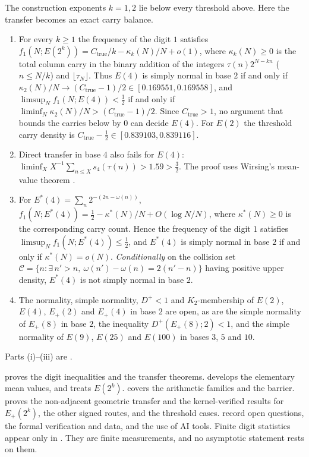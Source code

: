 \documentclass[11pt]{article}
\newcommand{\Ctrue}{C_{\mathrm{true}}}
\begin{document}
The construction exponents $k=1,2$ lie below every threshold above. Here the transfer becomes an exact carry balance.

\begin{maintheorem}\label{thm:thresholds}
\begin{enumerate}[label=\textup{(\roman*)},nosep]
\item {} For every $k\ge1$ the frequency of the digit $1$ satisfies $f_1(N;E(2^k))=\Ctrue/k-\kappa_k(N)/N+o(1)$, where $\kappa_k(N)\ge0$ is the total column carry in the binary addition of the integers $\tau(n)2^{N-kn}$ ($n\le N/k$) and $\lfloor\tau_N\rfloor$. Thus $E(4)$ is simply normal in base $2$ if and only if $\kappa_2(N)/N\to(\Ctrue-1)/2\in[0.169551,0.169558]$, and $\limsup_Nf_1(N;E(4))<\frac12$ if and only if $\liminf_N\kappa_2(N)/N>(\Ctrue-1)/2$. Since $\Ctrue>1$, no argument that bounds the carries below by $0$ can decide $E(4)$. For $E(2)$ the threshold carry density is $\Ctrue-\frac12\in[0.839103,0.839116]$.
\item {} Direct transfer in base $4$ also fails for $E(4)$: $\liminf_XX^{-1}\sum_{n\le X}s_4(\tau(n))>1.59>\frac32$. The proof uses Wirsing's mean-value theorem \cite{Wirsing1967}.
\item {} For $E^*(4)=\sum_n2^{-(2n-\omega(n))}$, $f_1(N;E^*(4))=\frac12-\kappa^*(N)/N+O(\log N/N)$, where $\kappa^*(N)\ge0$ is the corresponding carry count. Hence the frequency of the digit $1$ satisfies $\limsup_Nf_1(N;E^*(4))\le\frac12$, and $E^*(4)$ is simply normal in base $2$ if and only if $\kappa^*(N)=o(N)$. \emph{Conditionally} on the collision set $\mathcal C=\{n:\exists\,n'>n,\ \omega(n')-\omega(n)=2(n'-n)\}$ having positive upper density, $E^*(4)$ is not simply normal in base $2$.
\item {} The normality, simple normality, $D^+<1$ and $K_2$-membership of $E(2)$, $E(4)$, $E_+(2)$ and $E_+(4)$ in base $2$ are open, as are the simple normality of $E_+(8)$ in base $2$, the inequality $D^+(E_+(8);2)<1$, and the simple normality of $E(9)$, $E(25)$ and $E(100)$ in bases $3$, $5$ and $10$.
\end{enumerate}
\end{maintheorem}

Parts (i)--(iii) are .

 proves the digit inequalities and the transfer theorems.  develops the elementary mean values, and  treats $E(2^k)$.  covers the arithmetic families and the barrier.  proves the non-adjacent geometric transfer and the kernel-verified results for $E_+(2^k)$,  the other signed routes, and  the threshold cases.  record open questions, the formal verification and data, and the use of AI tools. Finite digit statistics appear only in . They are finite measurements, and no asymptotic statement rests on them.
\end{document}
